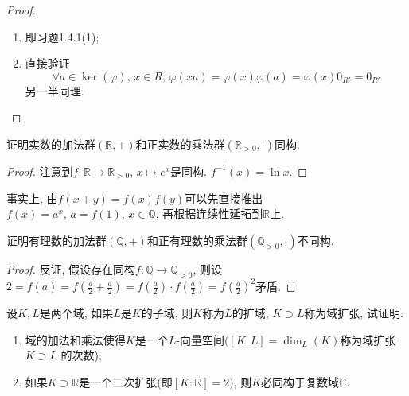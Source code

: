 \documentclass{../solutions-cn}
\begin{document}
\begin{proof}
    \begin{enumerate}[(1)]
        \item 即习题1.4.1(1);
        \item 直接验证
        \[
            \forall a \in \ker(\varphi),\, x \in R,\, \varphi(xa) = \varphi(x)\varphi(a) = \varphi(x)0_{R'} = 0_{R'}
        \]
        另一半同理.
    \end{enumerate}
\end{proof}

\begin{exercise}[习题1.4.5]
    证明实数的加法群$(\mathbb{R}, +)$和正实数的乘法群$(\mathbb{R}_{>0}, \cdot)$同构.
\end{exercise}

\begin{proof}
    注意到$f: \mathbb{R} \to \mathbb{R}_{>0},\, x \mapsto e^x$是同构. $f^{-1}(x) = \ln x$.
\end{proof}

\begin{remark}
    事实上, 由$f(x + y) = f(x)f(y)$可以先直接推出$f(x) = a^x,\, a = f(1),\, x \in \mathbb{Q}$, 再根据连续性延拓到$\mathbb{R}$上.
\end{remark}

\begin{exercise}[习题1.4.6]
    证明有理数的加法群$(\mathbb{Q}, +)$和正有理数的乘法群$(\mathbb{Q}_{>0}, \cdot)$不同构.
\end{exercise}

\begin{proof}
    反证, 假设存在同构$f: \mathbb{Q} \to \mathbb{Q}_{>0}$, 则设$2 = f(a) = f(\frac{a}{2} + \frac{a}{2}) = f(\frac{a}{2}) \cdot f(\frac{a}{2}) = f(\frac{a}{2})^2$矛盾.
\end{proof}

\begin{exercise}[习题1.4.9]
    设$K, L$是两个域, 如果$L$是$K$的子域, 则$K$称为$L$的扩域, $K \supset L$称为域扩张, 试证明:
    \begin{enumerate}[(1)]
        \item 域的加法和乘法使得$K$是一个$L$-向量空间$([K:L] = \dim_L(K)$称为域扩张$K \supset L$ 的次数);
        \item 如果$K \supset \mathbb{R}$是一个二次扩张(即$[K:\mathbb{R}] = 2)$, 则$K$必同构于复数域$\mathbb{C}$.
    \end{enumerate}
\end{exercise}
\end{document}
